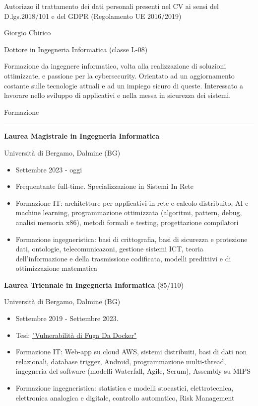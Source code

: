 \documentclass[a4paper]{letter}
\begin{document}
\hfill
\begin{minipage}[t]{0.65\textwidth}
\setlength{\baselineskip}{1.4\baselineskip}

{\tiny Autorizzo il trattamento dei dati personali presenti nel CV ai sensi del D.lgs.2018/101 e del GDPR (Regolamento UE 2016/2019)}
\vspace{0.3cm}


{\huge Giorgio Chirico}

{\large Dottore in Ingegneria Informatica (classe L-08)}

\vspace{0.5cm}
 
Formazione da ingegnere informatico, volta alla realizzazione di soluzioni ottimizzate, e passione per la cybersecurity. Orientato ad un aggiornamento costante sulle tecnologie attuali e ad un impiego sicuro di queste. Interessato a lavorare nello sviluppo di applicativi e nella messa in sicurezza dei sistemi.

\vspace{0.5cm}

{\large Formazione}
\rule{\linewidth}{0.4pt}

{\large \textbf{Laurea Magistrale in Ingegneria Informatica}}

{\small Università di Bergamo, Dalmine (BG)}
\begin{itemize}
    \item Settembre 2023 - oggi
    \item Frequentante full-time. Specializzazione in Sistemi In Rete
    \item Formazione IT: architetture per applicativi in rete e calcolo distribuito, AI e machine learning, programmazione ottimizzata (algoritmi, pattern, debug, analisi memoria x86), metodi formali e testing, progettazione compilatori
    \item Formazione ingegneristica: basi di crittografia, basi di sicurezza e protezione dati, ontologie, telecomunicazoni, gestione sistemi ICT, teoria dell'informazione e della trasmissione codificata, modelli predittivi e di ottimizzazione matematica
\end{itemize}

{\large \textbf{Laurea Triennale in Ingegneria Informatica} \small (85/110)}

{\small Università di Bergamo, Dalmine (BG)}
\begin{itemize}
    \item Settembre 2019 - Settembre 2023.
    \item Tesi: \href{https://github.com/giorgio-hash/tesi-triennio}{"Vulnerabilità di Fuga Da Docker"}
    \item Formazione IT: Web-app su cloud AWS, sistemi distribuiti, basi di dati non relazionali, database trigger, Android, programmazione multi-thread, ingegneria del software (modelli Waterfall, Agile, Scrum), Assembly su MIPS
    \item Formazione ingegneristica: statistica e modelli stocastici, elettrotecnica, elettronica analogica e digitale, controllo automatico, Risk Management
\end{itemize}


\end{minipage}
\end{document}
